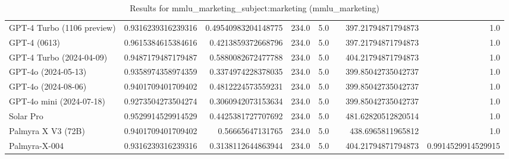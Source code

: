 \begin{table}[htp]
{\begin{tabular}{lrrrrrrr}
GPT-4 Turbo (1106 preview) & 0.9316239316239316 & 0.49540983204148775 & 234.0 & 5.0 &  & 397.21794871794873 & 1.0 \\
GPT-4 (0613) & 0.9615384615384616 & 0.4213859372668796 & 234.0 & 5.0 &  & 397.21794871794873 & 1.0 \\
GPT-4 Turbo (2024-04-09) & 0.9487179487179487 & 0.5880082672477788 & 234.0 & 5.0 &  & 404.21794871794873 & 1.0 \\
GPT-4o (2024-05-13) & 0.9358974358974359 & 0.3374974228378035 & 234.0 & 5.0 &  & 399.85042735042737 & 1.0 \\
GPT-4o (2024-08-06) & 0.9401709401709402 & 0.4812224573559231 & 234.0 & 5.0 &  & 399.85042735042737 & 1.0 \\
GPT-4o mini (2024-07-18) & 0.9273504273504274 & 0.3060942073153634 & 234.0 & 5.0 &  & 399.85042735042737 & 1.0 \\
Solar Pro & 0.9529914529914529 & 0.4425381727707692 & 234.0 & 5.0 &  & 481.62820512820514 & 1.0 \\
Palmyra X V3 (72B) & 0.9401709401709402 & 0.56665647131765 & 234.0 & 5.0 &  & 438.6965811965812 & 1.0 \\
Palmyra-X-004 & 0.9316239316239316 & 0.3138112644863944 & 234.0 & 5.0 &  & 404.21794871794873 & 0.9914529914529915 \\
\bottomrule
\end{tabular}}
\caption{Results for mmlu_marketing_subject:marketing (mmlu_marketing)}
\label{fig:mmlu_marketing_subject:marketing (mmlu_marketing)}
\end{table}